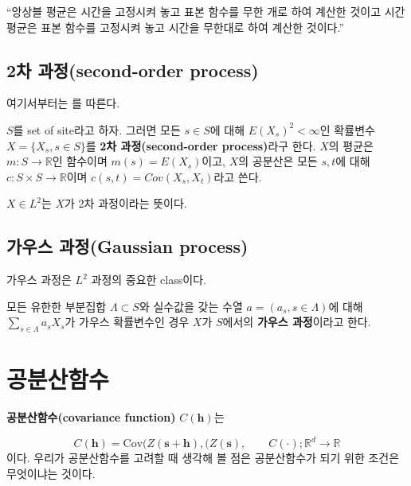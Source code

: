 \documentclass[b5paper,]{scrbook}
\theoremstyle{plain}
\theoremstyle{definition}
\numberwithin{equation}{section}
\let\BeginKnitrBlock\begin \let\EndKnitrBlock\end
\begin{document}
``앙상블 평균은 시간을 고정시켜 놓고 표본 함수를 무한 개로 하여 계산한
것이고 시간평균은 표본 함수를 고정시켜 놓고 시간을 무한대로 하여 계산한
것이다.''

\section{2차 과정(second-order process)}\label{-second-order-process}

여기서부터는 \citep{Gaetan2009}를 따른다.

\BeginKnitrBlock{definition}[2차 과정]
\protect\hypertarget{def:unnamed-chunk-204}{}{\label{def:unnamed-chunk-204}
{} }\(S\)를 set of site라고 하자. 그러면 모든
\(s\in S\)에 대해 \(E(X_{s})^{2}<\infty\)인 확률변수
\(X=\{X_{s}, s\in S\}\)를 \textbf{2차 과정(second-order process)}라구
한다. \(X\)의 평균은 \(m:S\rightarrow \mathbb{R}\)인 함수이며
\(m(s)=E(X_{s})\)이고, \(X\)의 공분산은 모든 \(s,t\)에 대해
\(c: S\times S \rightarrow \mathbb{R}\)이며
\(c(s,t)=Cov(X_{s},X_{t})\)라고 쓴다.
\EndKnitrBlock{definition}

\(X\in L^{2}\)는 \(X\)가 2차 과정이라는 뜻이다.

\section{가우스 과정(Gaussian process)}\label{-gaussian-process}

가우스 과정은 \(L^{2}\) 과정의 중요한 class이다.

\BeginKnitrBlock{definition}[가우스 과정]
\protect\hypertarget{def:unnamed-chunk-205}{}{\label{def:unnamed-chunk-205}
{} }모든 유한한 부분집합
\(\Lambda \subset S\)와 실수값을 갖는 수열 \(a=(a_{s}, s\in\Lambda)\)에
대해 \(\sum_{s\in\Lambda}a_{s}X_{s}\)가 가우스 확률변수인 경우 \(X\)가
\(S\)에서의 \textbf{가우스 과정}이라고 한다.
\EndKnitrBlock{definition}

\chapter{공분산함수}\label{covfct}

\textbf{공분산함수(covariance function)} \(C(\mathbf{h})\)는

\[C(\mathbf{h})=\text{Cov}(Z(\mathbf{s}+\mathbf{h}), (Z(\mathbf{s}), \qquad{C(\cdot); \mathbb{R}^{d} \rightarrow \mathbb{R}}\]
이다. 우리가 공분산함수를 고려할 때 생각해 볼 점은 공분산함수가 되기
위한 조건은 무엇이냐는 것이다.
\end{document}
